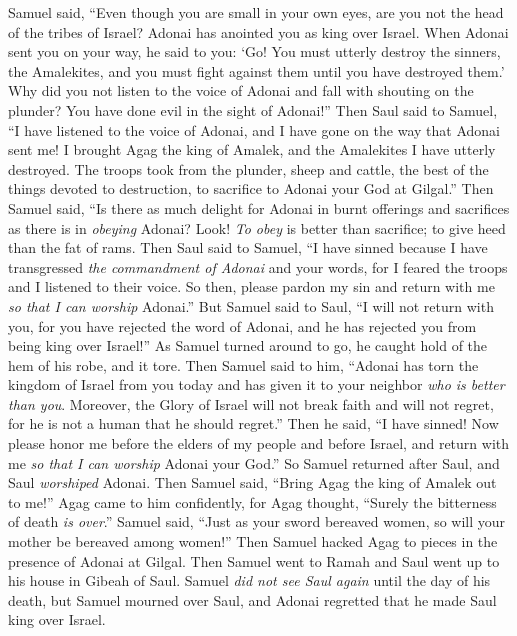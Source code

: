 \begin{biblechapter}
\verse Samuel said, “Even though you are small in your own eyes, are you not the head of the tribes of Israel? Adonai has anointed you as king over Israel.
\verse When Adonai sent you on your way, he said to you: ‘Go! You must utterly destroy the sinners, the Amalekites, and you must fight against them until you have destroyed them.’
\verse Why did you not listen to the voice of Adonai and fall with shouting on the plunder? You have done evil in the sight of Adonai!”
\verse Then Saul said to Samuel, “I have listened to the voice of Adonai, and I have gone on the way that Adonai sent me! I brought Agag the king of Amalek, and the Amalekites I have utterly destroyed.
\verse The troops took from the plunder, sheep and cattle, the best of the things devoted to destruction, to sacrifice to Adonai your God at Gilgal.”
\verse Then Samuel said,
\verse “Is there as much delight for Adonai in burnt offerings and sacrifices 
as there is in \textit{obeying} Adonai? 
Look! \textit{To obey} is better than sacrifice; 
to give heed than the fat of rams.
\verse Then Saul said to Samuel, “I have sinned because I have transgressed \textit{the commandment of Adonai} and your words, for I feared the troops and I listened to their voice.
\verse So then, please pardon my sin and return with me \textit{so that I can worship} Adonai.”
\verse But Samuel said to Saul, “I will not return with you, for you have rejected the word of Adonai, and he has rejected you from being king over Israel!”
\verse As Samuel turned around to go, he caught hold of the hem of his robe, and it tore.
\verse Then Samuel said to him, “Adonai has torn the kingdom of Israel from you today and has given it to your neighbor \textit{who is better than you}.
\verse Moreover, the Glory of Israel will not break faith and will not regret, for he is not a human that he should regret.”
\verse Then he said, “I have sinned! Now please honor me before the elders of my people and before Israel, and return with me \textit{so that I can worship} Adonai your God.”
\verse So Samuel returned after Saul, and Saul \textit{worshiped} Adonai.
\verse Then Samuel said, “Bring Agag the king of Amalek out to me!” Agag came to him confidently, for Agag thought, “Surely the bitterness of death \textit{is over}.”
\verse Samuel said, “Just as your sword bereaved women, 
so will your mother be bereaved among women!” Then Samuel hacked Agag to pieces in the presence of Adonai at Gilgal.
\verse Then Samuel went to Ramah and Saul went up to his house in Gibeah of Saul.
\verse Samuel \textit{did not see Saul again} until the day of his death, but Samuel mourned over Saul, and Adonai regretted that he made Saul king over Israel.
\end{biblechapter}

